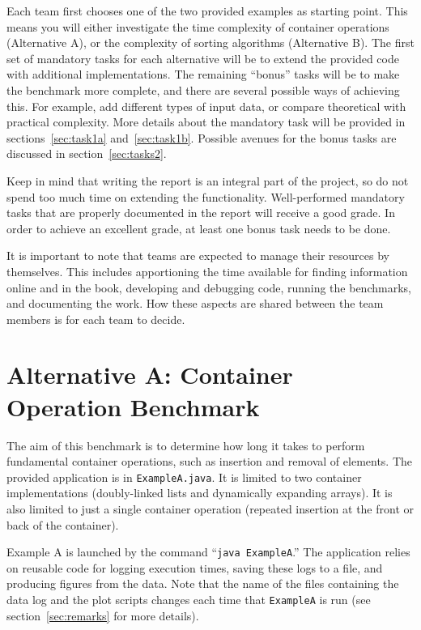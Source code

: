 \documentclass[a4paper,10pt]{article}
\begin{document}
Each team first chooses one of the two provided examples as starting point.
This means you will either investigate the time complexity of container operations (Alternative A), or the complexity of sorting algorithms (Alternative B).
The first set of mandatory tasks for each alternative will be to extend the provided code with additional implementations.
The remaining ``bonus'' tasks will be to make the benchmark more complete, and there are several possible ways of achieving this.
For example, add different types of input data, or compare theoretical with practical complexity.
More details about the mandatory task will be provided in sections~\ref{sec:task1a} and~\ref{sec:task1b}.
Possible avenues for the bonus tasks are discussed in section~\ref{sec:tasks2}.

Keep in mind that writing the report is an integral part of the project, so do not spend too much time on extending the functionality.
Well-performed mandatory tasks that are properly documented in the report will receive a good grade.
In order to achieve an excellent grade, at least one bonus task needs to be done.

It is important to note that teams are expected to manage their resources by themselves.
This includes apportioning the time available for finding information online and in the book, developing and debugging code, running the benchmarks, and documenting the work.
How these aspects are shared between the team members is for each team to decide.



\section{Alternative A: Container Operation Benchmark}

The aim of this benchmark is to determine how long it takes to perform fundamental container operations, such as insertion and removal of elements.
The provided application is in \texttt{ExampleA.java}.
It is limited to two container implementations (doubly-linked lists and dynamically expanding arrays).
It is also limited to just a single container operation (repeated insertion at the front or back of the container).

Example A is launched by the command ``\texttt{java ExampleA}.''
The application relies on reusable code for logging execution times, saving these logs to a file, and producing figures from the data.
Note that the name of the files containing the data log and the plot scripts changes each time that \texttt{ExampleA} is run (see section~\ref{sec:remarks} for more details).
\end{document}

